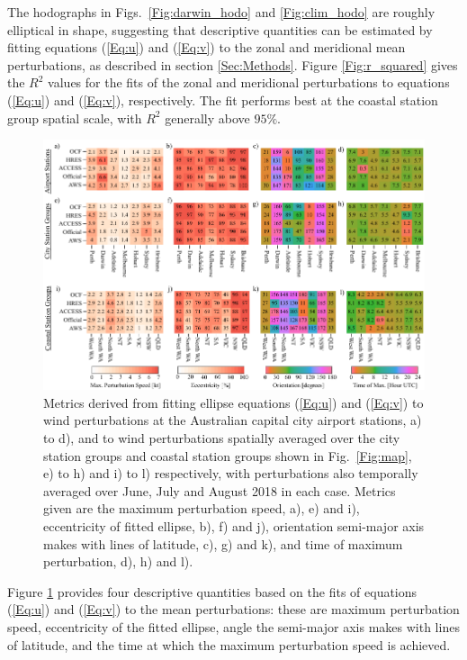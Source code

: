 \documentclass{ametsoc}
\begin{document}
The hodographs in Figs.~\ref{Fig:darwin_hodo} and \ref{Fig:clim_hodo} are roughly elliptical in shape, suggesting that descriptive quantities can be estimated by fitting equations (\ref{Eq:u}) and (\ref{Eq:v}) to the zonal and meridional mean perturbations, as described in section \ref{Sec:Methods}. Figure \ref{Fig:r_squared} gives the $R^2$ values for the fits of the zonal and meridional perturbations to equations (\ref{Eq:u}) and (\ref{Eq:v}), respectively. The fit performs best at the coastal station group spatial scale, with $R^2$ generally above $95\%$. 

\begin{figure}
\centering
\includegraphics[width=39pc]{ellipse_fits.pdf}
\caption{Metrics derived from fitting ellipse equations (\ref{Eq:u}) and (\ref{Eq:v}) to wind perturbations at the Australian capital city airport stations, a) to d), and to wind perturbations spatially averaged over the city station groups and coastal station groups shown in Fig.~\ref{Fig:map}, e) to h) and i) to l) respectively, with perturbations also temporally averaged over June, July and August 2018 in each case. Metrics given are the maximum perturbation speed, a), e) and i), eccentricity of fitted ellipse, b), f) and j), orientation semi-major axis makes with lines of latitude, c), g) and k), and time of maximum perturbation, d), h) and l).}
\label{Fig:ellipse_fits}
\end{figure}

Figure \ref{Fig:ellipse_fits} provides four descriptive quantities based on the fits of equations (\ref{Eq:u}) and (\ref{Eq:v}) to the mean perturbations: these are maximum perturbation speed, eccentricity of the fitted ellipse, angle the semi-major axis makes with lines of latitude, and the time at which the maximum perturbation speed is achieved. 
\end{document}

